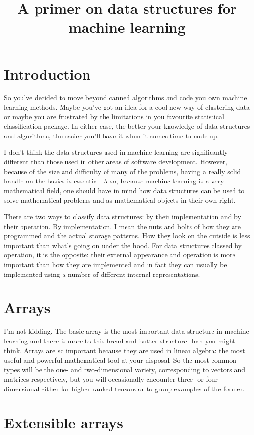 \documentclass{article}
\title{A primer on data structures for machine learning}
\begin{document}
\section{Introduction}

So you've decided to move beyond canned algorithms and code you own machine
learning methods.
Maybe you've got an idea for a cool new way of clustering data or maybe you
are frustrated by the limitations in you favourite statistical classification
package.
In either case, the better your knowledge of data structures and algorithms,
the easier you'll have it when it comes time to code up.

I don't think the data structures used in machine learning are significantly
different than those used in other areas of software development.
However, because of the size and difficulty of many of the problems, having
a really solid handle on the basics is essential.
Also, because machine learning is a very mathematical field, one should have in
mind how data structures can be used to solve mathematical problems and 
as mathematical objects in their own right.

There are two ways to classify data structures: by their implementation and by
their operation.
By implementation, I mean the nuts and bolts of how they are programmed and
the actual storage patterns.
How they look on the outside is less important than what's going on under the
hood.
For data structures classed by operation, it is the opposite: their external
appearance and operation is more important than how they are implemented
and in fact they can usually be implemented using a number of different internal
representations.

\section{Arrays}

I'm not kidding. The basic array is the most important data structure in
machine learning and there is more to this bread-and-butter structure than
you might think.
Arrays are so important because they are used in linear algebra: the most 
useful and powerful mathematical tool at your disposal.
So the most common types will be the one- and two-dimensional variety,
corresponding to vectors and matrices respectively, but you will occasionally
encounter three- or four-dimensional either for higher ranked tensors or to
group examples of the former.

\section{Extensible arrays}
\end{document}

